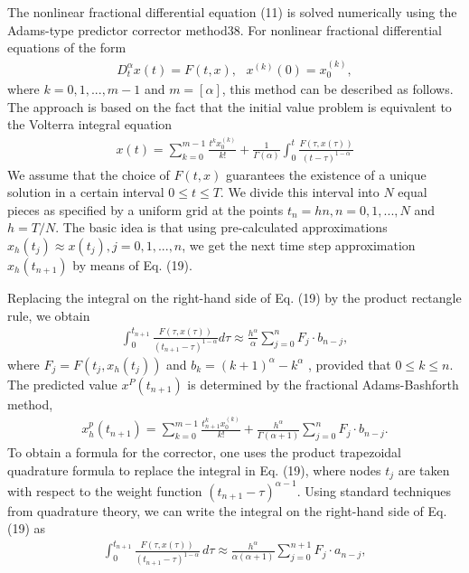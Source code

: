\documentclass[10pt]{article}
\begin{document}
\begin{multicols}{2}
The nonlinear fractional differential equation (11)
is solved numerically using the Adams-type predictor corrector method38. For nonlinear fractional differential equations of the form
\begin{align}
    D_t^\alpha x(t) = F(t,x), ~~~ x^{(k)}(0) = x_0^{(k)},
\end{align}
where $k = 0, 1, . . . , m - 1$ and $m = [\alpha]$, this method can
be described as follows. The approach is based on the
fact that the initial value problem is equivalent to the
Volterra integral equation
\begin{align}
    x(t) = \sum_{k=0}^{m-1} \frac{t^k x_0^{(k)}}{k!} + \frac{1}{\Gamma (\alpha)} \int_0^t \frac{F(\tau , x(\tau))}{(t- \tau)^{1-\alpha}}
\end{align}
We assume that the choice of $F(t, x)$ guarantees the existence of a unique solution in a certain interval $0 \le t \le T$.
We divide this interval into $N$ equal pieces as specified
by a uniform grid at the points $t_n = hn, n = 0, 1, . . . , N$
and $h = T / N$. The basic idea is that using pre-calculated
approximations $x_h(t_j ) \approx x(t_j ), j = 0, 1, . . . , n$, we get
the next time step approximation $x_h(t_{n+1})$ by means of
Eq. (19). \par
Replacing the integral on the right-hand side of
Eq. (19) by the product rectangle rule, we obtain
\begin{align}
    \int_0^{t_{n+1}} \frac{F(\tau , x(\tau))}{(t_{n+1}-\tau)^{1-\alpha}}d\tau \approx \frac{h^\alpha}{\alpha} \sum_{j=0}^n F_j \cdot b_{n-j},
\end{align}
where $F_j = F(t_j , x_h(t_j))$ and $b_k = (k + 1)^\alpha - k^\alpha$
, provided that $0 \le k \le n$. The predicted value $x^P (t_{n+1})$ is
determined by the fractional Adams-Bashforth method,
\begin{align}
   x_h^p (t_{n+1}) = \sum_{k=0}^{m-1} \frac{t_{n+1}^k x_0^{(k)}}{k!} + \frac{h^\alpha}{\Gamma (\alpha + 1)} \sum_{j=0}^n F_j \cdot b_{n-j}.
\end{align}
To obtain a formula for the corrector, one uses the product trapezoidal quadrature formula to replace the integral in Eq. (19), where nodes $t_j$ are taken with respect to the weight function $(t_{n+1} - \tau)^{\alpha - 1}$. Using standard techniques from quadrature theory, we can write the integral on the right-hand side of Eq. (19) as
\begin{align}
   \int_0^{t_{n+1}} \frac{F(\tau,x(\tau))}{(t_{n+1}-\tau)^{1-\alpha}}\,d\tau \approx \frac{h^\alpha}{\alpha(\alpha + 1)} \sum_{j=0}^{n+1} F_j \cdot a_{n-j},

\end{align}
\end{multicols}
\end{document}
